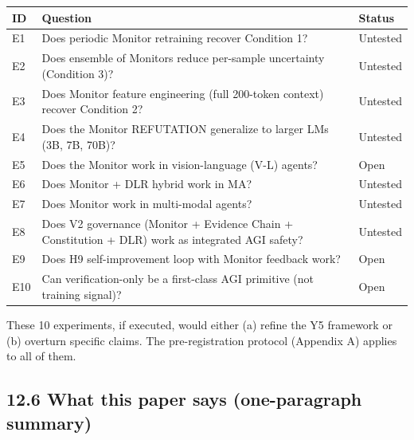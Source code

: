 \documentclass[11pt]{article}
\begin{document}
{\def\LTcaptype{none} %
\begin{longtable}[]{@{}
  >{\raggedright\arraybackslash}p{}
  >{\raggedright\arraybackslash}p{}
  >{\raggedright\arraybackslash}p{}@{}}
\toprule\noalign{}
\begin{minipage}[b]{\linewidth}\raggedright
ID
\end{minipage} & \begin{minipage}[b]{\linewidth}\raggedright
Question
\end{minipage} & \begin{minipage}[b]{\linewidth}\raggedright
Status
\end{minipage} \\
\midrule\noalign{}
\endhead
\bottomrule\noalign{}
\endlastfoot
E1 & Does periodic Monitor retraining recover Condition 1? & Untested \\
E2 & Does ensemble of Monitors reduce per-sample uncertainty (Condition
3)? & Untested \\
E3 & Does Monitor feature engineering (full 200-token context) recover
Condition 2? & Untested \\
E4 & Does the Monitor REFUTATION generalize to larger LMs (3B, 7B, 70B)?
& Untested \\
E5 & Does the Monitor work in vision-language (V-L) agents? & Open \\
E6 & Does Monitor + DLR hybrid work in MA? & Untested \\
E7 & Does Monitor work in multi-modal agents? & Untested \\
E8 & Does V2 governance (Monitor + Evidence Chain + Constitution + DLR)
work as integrated AGI safety? & Untested \\
E9 & Does H9 self-improvement loop with Monitor feedback work? & Open \\
E10 & Can verification-only be a first-class AGI primitive (not training
signal)? & Open \\
\end{longtable}
}

These 10 experiments, if executed, would either (a) refine the Y5
framework or (b) overturn specific claims. The pre-registration protocol
(Appendix A) applies to all of them.

\subsection{12.6 What this paper says (one-paragraph
summary)}\label{what-this-paper-says-one-paragraph-summary}
\end{document}

